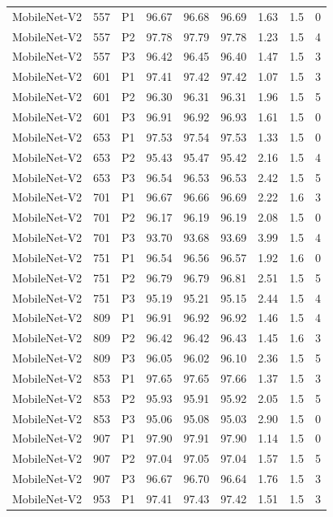 {\begin{longtable}{lrlrrrrrr}
MobileNet-V2 & 557 & P1 & 96.67 & 96.68 & 96.69 & 1.63 & 1.5 & 0 \\
MobileNet-V2 & 557 & P2 & 97.78 & 97.79 & 97.78 & 1.23 & 1.5 & 4 \\
MobileNet-V2 & 557 & P3 & 96.42 & 96.45 & 96.40 & 1.47 & 1.5 & 3 \\
MobileNet-V2 & 601 & P1 & 97.41 & 97.42 & 97.42 & 1.07 & 1.5 & 3 \\
MobileNet-V2 & 601 & P2 & 96.30 & 96.31 & 96.31 & 1.96 & 1.5 & 5 \\
MobileNet-V2 & 601 & P3 & 96.91 & 96.92 & 96.93 & 1.61 & 1.5 & 0 \\
MobileNet-V2 & 653 & P1 & 97.53 & 97.54 & 97.53 & 1.33 & 1.5 & 0 \\
MobileNet-V2 & 653 & P2 & 95.43 & 95.47 & 95.42 & 2.16 & 1.5 & 4 \\
MobileNet-V2 & 653 & P3 & 96.54 & 96.53 & 96.53 & 2.42 & 1.5 & 5 \\
MobileNet-V2 & 701 & P1 & 96.67 & 96.66 & 96.69 & 2.22 & 1.6 & 3 \\
MobileNet-V2 & 701 & P2 & 96.17 & 96.19 & 96.19 & 2.08 & 1.5 & 0 \\
MobileNet-V2 & 701 & P3 & 93.70 & 93.68 & 93.69 & 3.99 & 1.5 & 4 \\
MobileNet-V2 & 751 & P1 & 96.54 & 96.56 & 96.57 & 1.92 & 1.6 & 0 \\
MobileNet-V2 & 751 & P2 & 96.79 & 96.79 & 96.81 & 2.51 & 1.5 & 5 \\
MobileNet-V2 & 751 & P3 & 95.19 & 95.21 & 95.15 & 2.44 & 1.5 & 4 \\
MobileNet-V2 & 809 & P1 & 96.91 & 96.92 & 96.92 & 1.46 & 1.5 & 4 \\
MobileNet-V2 & 809 & P2 & 96.42 & 96.42 & 96.43 & 1.45 & 1.6 & 3 \\
MobileNet-V2 & 809 & P3 & 96.05 & 96.02 & 96.10 & 2.36 & 1.5 & 5 \\
MobileNet-V2 & 853 & P1 & 97.65 & 97.65 & 97.66 & 1.37 & 1.5 & 3 \\
MobileNet-V2 & 853 & P2 & 95.93 & 95.91 & 95.92 & 2.05 & 1.5 & 5 \\
MobileNet-V2 & 853 & P3 & 95.06 & 95.08 & 95.03 & 2.90 & 1.5 & 0 \\
MobileNet-V2 & 907 & P1 & 97.90 & 97.91 & 97.90 & 1.14 & 1.5 & 0 \\
MobileNet-V2 & 907 & P2 & 97.04 & 97.05 & 97.04 & 1.57 & 1.5 & 5 \\
MobileNet-V2 & 907 & P3 & 96.67 & 96.70 & 96.64 & 1.76 & 1.5 & 3 \\
MobileNet-V2 & 953 & P1 & 97.41 & 97.43 & 97.42 & 1.51 & 1.5 & 3 \\

\end{longtable}}

